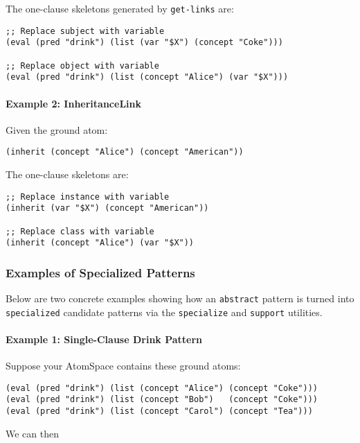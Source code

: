\documentclass{article}
\begin{document}
The one-clause skeletons generated by \texttt{get-links} are:

\begin{verbatim}
;; Replace subject with variable
(eval (pred "drink") (list (var "$X") (concept "Coke")))

;; Replace object with variable
(eval (pred "drink") (list (concept "Alice") (var "$X")))
\end{verbatim}

\paragraph{Example 2: InheritanceLink}

Given the ground atom:

\begin{verbatim}
(inherit (concept "Alice") (concept "American"))
\end{verbatim}

The one-clause skeletons are:

\begin{verbatim}
;; Replace instance with variable
(inherit (var "$X") (concept "American"))

;; Replace class with variable
(inherit (concept "Alice") (var "$X"))
\end{verbatim}


\subsubsection{Examples of Specialized Patterns}

Below are two concrete examples showing how an \texttt{abstract} pattern is turned into \texttt{specialized} candidate patterns via the \texttt{specialize} and \texttt{support} utilities.

\paragraph{Example 1: Single-Clause Drink Pattern}

Suppose your AtomSpace contains these ground atoms:
\begin{verbatim}
(eval (pred "drink") (list (concept "Alice") (concept "Coke")))
(eval (pred "drink") (list (concept "Bob")   (concept "Coke")))
(eval (pred "drink") (list (concept "Carol") (concept "Tea")))
\end{verbatim}

We can then
\end{document}
